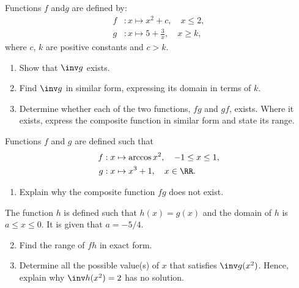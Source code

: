 \begin{problem}
    Functions $f$ and$ g$ are defined by:
    \begin{align*}
        f &: x \mapsto x^2 + c, \quad x \leq 2,\\
        g &: x \mapsto 5 + \frac3x, \quad x \geq k,
    \end{align*}
    where $c$, $k$ are positive constants and $c>k$.
    \begin{enumerate}
        \item Show that $\inv g$ exists.
        \item Find $\inv g$ in similar form, expressing its domain in terms of $k$.
        \item Determine whether each of the two functions, $fg$ and $gf$, exists. Where it exists, express the composite function in similar form and state its range.
    \end{enumerate}
\end{problem}

\begin{problem}[\chili]
    Functions $f$ and $g$ are defined such that    
    \begin{align*}
        f &: x \mapsto \arccos{x^2}, \quad -1 \leq x \leq 1,\\
        g &: x \mapsto x^3 + 1, \quad x \in \RR.
    \end{align*}

    \begin{enumerate}
        \item Explain why the composite function $fg$ does not exist.
    \end{enumerate}
    
    The function $h$ is defined such that $h(x) = g(x)$ and the domain of $h$ is $a \leq x \leq 0$. It is given that $a = -5/4$.

    \begin{enumerate}
        \setcounter{enumi}{1}
        \item Find the range of $fh$ in exact form.
        \item Determine all the possible value(s) of $x$ that satisfies $\inv g(x^2)$. Hence, explain why $\inv h (x^2) = 2$ has no solution.
    \end{enumerate}
\end{problem}